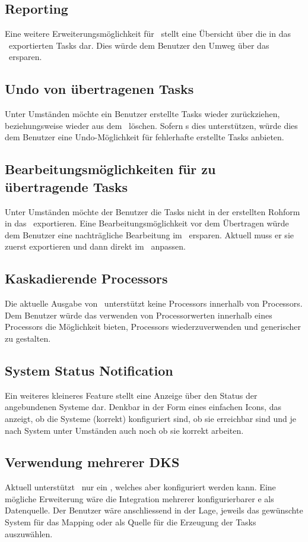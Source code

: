 		
		\subsection{Reporting}
			Eine weitere Erweiterungsmöglichkeit für \eeppi\ stellt eine Übersicht über die in das \ppt\ exportierten Tasks dar.
			Dies würde dem Benutzer den Umweg über das \ppt\ ersparen.
		
		
		\subsection{Undo von übertragenen Tasks}
			Unter Umständen möchte ein Benutzer erstellte Tasks wieder zurückziehen,
			beziehungsweise wieder aus dem \ppt\ löschen.
			Sofern \ppt s dies unterstützen, würde dies dem Benutzer eine Undo-Möglichkeit für fehlerhafte erstellte Tasks anbieten.
		
		
		\subsection{Bearbeitungsmöglichkeiten für zu übertragende Tasks}
			Unter Umständen möchte der Benutzer die Tasks nicht in der erstellten Rohform in das \ppt\ exportieren.
			Eine Bearbeitungsmöglichkeit vor dem Übertragen würde dem Benutzer eine nachträgliche Bearbeitung im \ppt\ ersparen.
			Aktuell muss er sie zuerst exportieren und dann direkt im \ppt\ anpassen.
			
			
		\subsection{Kaskadierende Processors}
			Die aktuelle Ausgabe von \eeppi\ unterstützt keine Processors innerhalb von Processors.
			Dem Benutzer würde das verwenden von Processorwerten innerhalb eines Processors die Möglichkeit bieten, Processors wiederzuverwenden und generischer zu gestalten.
			
			
		\subsection{System Status Notification}
			Ein weiteres kleineres Feature stellt eine Anzeige über den Status der angebundenen Systeme dar.
			Denkbar in der Form eines einfachen Icons, das anzeigt, 
			ob die Systeme (korrekt) konfiguriert sind, ob sie erreichbar sind
			und je nach System unter Umständen auch noch ob sie korrekt arbeiten.		
		
		
	
		\subsection{Verwendung mehrerer DKS}
			Aktuell unterstützt \eeppi\ nur ein \dks, welches aber konfiguriert werden kann.
			Eine mögliche Erweiterung wäre die Integration mehrerer konfigurierbarer \dks e als Datenquelle.
			Der Benutzer wäre anschliessend in der Lage, jeweils das gewünschte System für das Mapping oder als Quelle für die Erzeugung der Tasks auszuwählen.
		
